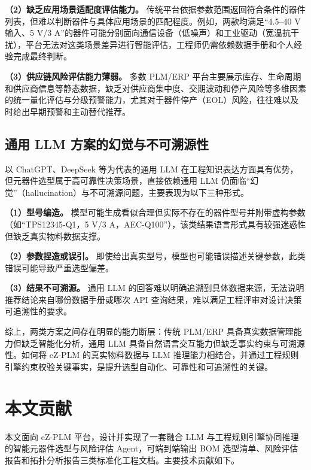 \textbf{（2）缺乏应用场景适配度评估能力。} 传统平台依据参数范围返回符合条件的器件列表，但难以判断器件与具体应用场景的匹配程度。例如，两款均满足“4.5--40 V 输入、5 V/3 A”的器件可能分别面向通信设备（低噪声）和工业驱动（宽温抗干扰），平台无法对这类场景差异进行智能评估，工程师仍需依赖数据手册和个人经验完成最终判断。

\textbf{（3）供应链风险评估能力薄弱。} 多数 PLM/ERP 平台主要展示库存、生命周期和供应商信息等静态数据，缺乏对供应商集中度\cite{pecht2002electronic}、交期波动和停产风险等多维因素的统一量化评估与分级预警能力\cite{goel2021supply}，尤其对于器件停产（EOL）风险，往往难以及时给出早期预警和主动替代推荐\cite{sandborn2013forecasting}。

\subsection{通用 LLM 方案的幻觉与不可溯源性}

以 ChatGPT、DeepSeek 等为代表的通用 LLM 在工程知识表达方面具有优势，但元器件选型属于高可靠性决策场景，直接依赖通用 LLM 仍面临“幻觉”（hallucination）与不可溯源问题\cite{wang2023survey}，主要表现为以下三种形式。

\textbf{（1）型号编造。} 模型可能生成看似合理但实际不存在的器件型号并附带虚构参数（如“TPS12345-Q1，5 V/3 A，AEC-Q100”），该类结果语言形式具有较强迷惑性但缺乏真实物料数据支撑。

\textbf{（2）参数捏造或误引。} 即使给出真实型号，模型也可能错误描述关键参数，此类错误可能导致严重选型偏差。

\textbf{（3）结果不可溯源。} 通用 LLM 的回答难以明确追溯到具体数据来源，无法说明推荐结论来自哪份数据手册或哪次 API 查询结果，难以满足工程评审对设计决策可追溯性的要求。

综上，两类方案之间存在明显的能力断层：传统 PLM/ERP 具备真实数据管理能力但缺乏智能化分析，通用 LLM 具备自然语言交互能力但缺乏事实约束与可溯源性\cite{lewis2020rag,gao2023retrieval}。如何将 eZ-PLM 的真实物料数据与 LLM 推理能力相结合，并通过工程规则引擎约束校验关键事实，是提升选型自动化、可靠性和可追溯性的关键。

\section{本文贡献}

本文面向 eZ-PLM 平台，设计并实现了一套融合 LLM 与工程规则引擎协同推理的智能元器件选型与风险评估 Agent，可端到端输出 BOM 选型清单、风险评估报告和拓扑分析报告三类标准化工程文档。主要技术贡献如下。


